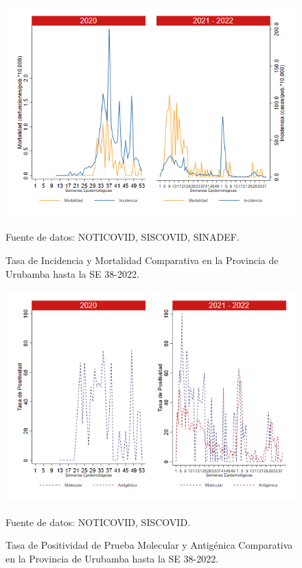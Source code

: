 \documentclass[12pt,a4paper,openany]{book}
\begin{document}
	\begin{figure}[h]
		\caption{Tasa de Incidencia y Mortalidad Comparativa en la Provincia de Urubamba hasta la SE 38-2022.}\label{fig:inc_urub}
		\begin{center}
			\includegraphics[width=0.85\linewidth]{../figuras/incidencia_mortalidad_20_21_13.png}
		\end{center}
		{\footnotesize {Fuente de datos: NOTICOVID, SISCOVID, SINADEF.}}
	\end{figure}
	
	\begin{figure}[h]
		\caption{Tasa de Positividad de Prueba Molecular y Antigénica Comparativa en la Provincia de Urubamba hasta la SE 38-2022.}\label{fig:positividad_urub}
		\begin{center}
			\includegraphics[width=0.7\linewidth]{../figuras/positividad_20_21_13.png}
		\end{center}
		{\footnotesize {Fuente de datos: NOTICOVID, SISCOVID.}}
	\end{figure}
	
\end{document}

